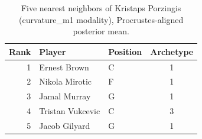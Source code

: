 \begin{table}[htbp]
  \centering\small
  \begin{tabular}{rllc}
    \toprule
    Rank & Player & Position & Archetype \\
    \midrule
    1 & Ernest Brown & C & 1 \\
    2 & Nikola Mirotic & F & 1 \\
    3 & Jamal Murray & G & 1 \\
    4 & Tristan Vukcevic & C & 3 \\
    5 & Jacob Gilyard & G & 1 \\
    \bottomrule
  \end{tabular}
  \caption{Five nearest neighbors of Kristaps Porzingis (curvature_m1 modality), Procrustes-aligned posterior mean.}
  \label{tab:Kristaps_Porzingis_neighbors_curvature_m1}
\end{table}


